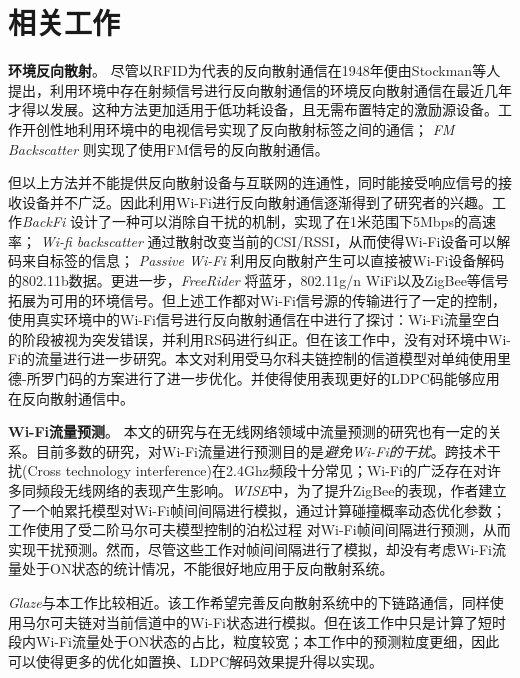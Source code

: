 
\chapter{相关工作}
\label{chap:related}

\textbf{环境反向散射}。
尽管以RFID为代表的反向散射通信在1948年便由Stockman等人提出\cite{stockman1948communication}，利用环境中存在射频信号进行反向散射通信的环境反向散射通信在最近几年才得以发展。这种方法更加适用于低功耗设备，且无需布置特定的激励源设备。工作\cite{liu2013ambient}开创性地利用环境中的电视信号实现了反向散射标签之间的通信；
\textit{FM Backscatter}\cite{wang2017fm}%
则实现了使用FM信号的反向散射通信。

但以上方法并不能提供反向散射设备与互联网的连通性，同时能接受响应信号的接收设备并不广泛。因此利用Wi-Fi进行反向散射通信逐渐得到了研究者的兴趣。工作\textit{BackFi}
\cite{bharadia2015backfi} %
设计了一种可以消除自干扰的机制，实现了在1米范围下5Mbps的高速率；
\textit{Wi-fi backscatter}\cite{kellogg2014wi}
通过散射改变当前的CSI/RSSI，从而使得Wi-Fi设备可以解码来自标签的信息；
\textit{Passive Wi-Fi}\cite{kellogg2016passive}%
利用反向散射产生可以直接被Wi-Fi设备解码的802.11b数据。更进一步，\textit{FreeRider}\cite{zhang2017freerider}
将蓝牙，802.11g/n WiFi以及ZigBee等信号拓展为可用的环境信号。但上述工作都对Wi-Fi信号源的传输进行了一定的控制，使用真实环境中的Wi-Fi信号进行反向散射通信在\cite{OFFB}中进行了探讨：Wi-Fi流量空白的阶段被视为突发错误，并利用RS码进行纠正。但在该工作中，没有对环境中Wi-Fi的流量进行进一步研究。本文对利用受马尔科夫链控制的信道模型对单纯使用里德-所罗门码的方案进行了进一步优化。并使得使用表现更好的LDPC码能够应用在反向散射通信中。

\textbf{Wi-Fi流量预测}。
本文的研究与在无线网络领域中流量预测的研究也有一定的关系。目前多数的研究，对Wi-Fi流量进行预测目的是\emph{避免Wi-Fi的干扰}。跨技术干扰(Cross technology interference)在2.4Ghz频段十分常见；Wi-Fi的广泛存在对许多同频段无线网络的表现产生影响。\textit{WISE}\cite{huang2010beyond}中，为了提升ZigBee的表现，作者建立了一个帕累托模型对Wi-Fi帧间间隔进行模拟，通过计算碰撞概率动态优化参数；工作\cite{dhanapala2017modeling}使用了受二阶马尔可夫模型控制的泊松过程
对Wi-Fi帧间间隔进行预测，从而实现干扰预测。然而，尽管这些工作对帧间间隔进行了模拟，却没有考虑Wi-Fi流量处于ON状态的统计情况，不能很好地应用于反向散射系统。

\textit{Glaze}\cite{kapetanovic2019glaze}与本工作比较相近。该工作希望完善反向散射系统中的下链路通信，同样使用马尔可夫链对当前信道中的Wi-Fi状态进行模拟。但在该工作中只是计算了短时段内Wi-Fi流量处于ON状态的占比，粒度较宽；本工作中的预测粒度更细，因此可以使得更多的优化如置换、LDPC解码效果提升得以实现。
